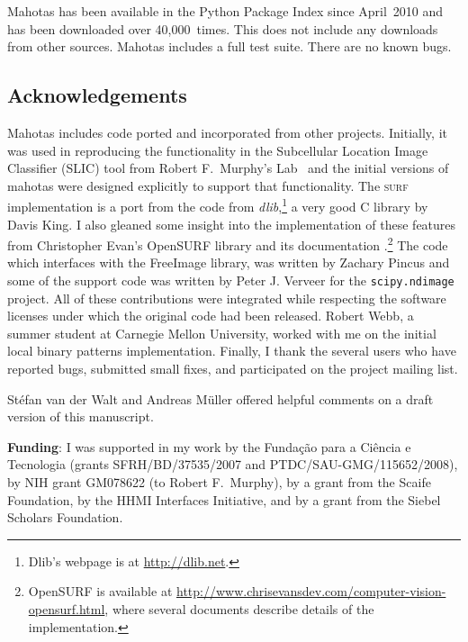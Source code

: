 \documentclass{scrartcl}
\newcommand*{\cpp}{{C\nolinebreak[4]\hspace{-.05em}\raisebox{.4ex}{\tiny\textbf{++}}}}
\let\code\texttt
\begin{document}
Mahotas has been available in the Python Package Index since April~2010 and has
been downloaded over 40,000~times. This does not include any downloads from
other sources. Mahotas includes a full test suite. There are no known bugs.

\subsection*{Acknowledgements}

Mahotas includes code ported and incorporated from other projects. Initially,
it was used in reproducing the functionality in the Subcellular Location Image
Classifier (SLIC) tool from Robert F.\ Murphy's
Lab~\citep{springerlink:10.1007/978-0-387-45524-2_47} and the initial versions
of mahotas were designed explicitly to support that functionality. The
\textsc{surf} implementation is a port from the code from
\textit{dlib},\footnote{Dlib's webpage is at \url{http://dlib.net}.} a very
good \cpp{} library by Davis King. I also gleaned some insight into the
implementation of these features from Christopher Evan's OpenSURF library and
its documentation \citep{evans2009}.\footnote{OpenSURF is available at
\url{http://www.chrisevansdev.com/computer-vision-opensurf.html}, where several
documents describe details of the implementation.} The code which interfaces
with the FreeImage library, was written by Zachary Pincus and some of the
support code was written by Peter J. Verveer for the \code{scipy.ndimage}
project. All of these contributions were integrated while respecting the
software licenses under which the original code had been released. Robert Webb,
a summer student at Carnegie Mellon University, worked with me on the initial
local binary patterns implementation. Finally, I thank the several users who
have reported bugs, submitted small fixes, and participated on the project
mailing list.

Stéfan van der Walt and Andreas Müller offered helpful comments on a draft
version of this manuscript.

\textbf{Funding}: I was supported in my work by the Funda\c c\~{a}o para a
Ci\^encia e Tecnologia (grants SFRH/BD/37535/2007 and
PTDC/SAU-GMG/115652/2008), by NIH grant GM078622 (to Robert F.\ Murphy), by a
grant from the Scaife Foundation, by the HHMI Interfaces Initiative, and by a
grant from the Siebel Scholars Foundation.


\end{document}
